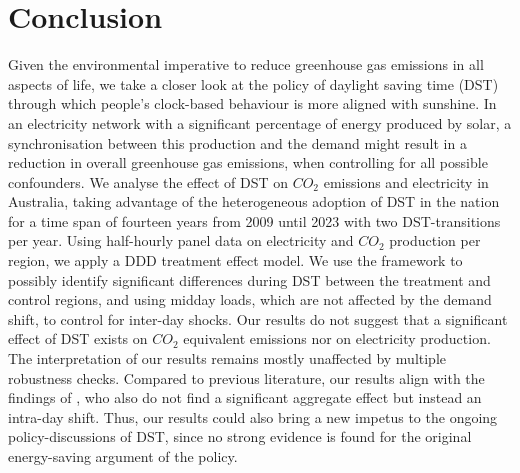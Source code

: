 \section{Conclusion}
Given the environmental imperative to reduce greenhouse gas emissions in all aspects of life, we take a closer look at the policy of daylight saving time (\ac{DST}) through which people's clock-based behaviour is more aligned with sunshine. In an electricity network with a significant percentage of energy produced by solar, a synchronisation between this production and the demand might result in a reduction in overall greenhouse gas emissions, when controlling for all possible confounders. 
We analyse the effect of DST on $CO_2$ emissions and electricity in Australia, taking advantage of the heterogeneous adoption of DST in the nation for a time span of fourteen years from 2009 until 2023 with two \ac{DST}-transitions per year. Using half-hourly panel data on electricity and $CO_2$ production per region, we apply a \ac{DDD} treatment effect model. We use the framework to possibly identify significant differences during \ac{DST} between the treatment and control regions, and using midday loads, which are not affected by the demand shift, to control for inter-day shocks. Our results do not suggest that a significant effect of DST exists on $CO_2$ equivalent emissions nor on electricity production. The interpretation of our results remains mostly unaffected by multiple robustness checks. Compared to previous literature, our results align with the findings of \textcites{kellogg_daylight_2008}, who also do not find a significant aggregate effect but instead an intra-day shift. 
Thus, our results could also bring a new impetus to the ongoing policy-discussions of \ac{DST}, since no strong evidence is found for the original energy-saving argument of the policy. 